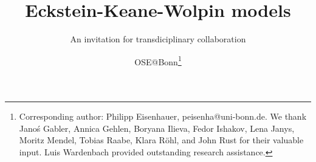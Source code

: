 
\title{Eckstein-Keane-Wolpin models}
\subtitle{An invitation for transdiciplinary collaboration}
\author{OSE@Bonn\thanks{Corresponding author: Philipp Eisenhauer, peisenha@uni-bonn.de. We thank  Jano\'s Gabler, Annica Gehlen, Boryana Ilieva, Fedor Ishakov, Lena Janys, Moritz Mendel, Tobias Raabe, Klara R\"ohl, and John Rust for their valuable input. Luis Wardenbach provided outstanding research assistance.}}
\date{}
